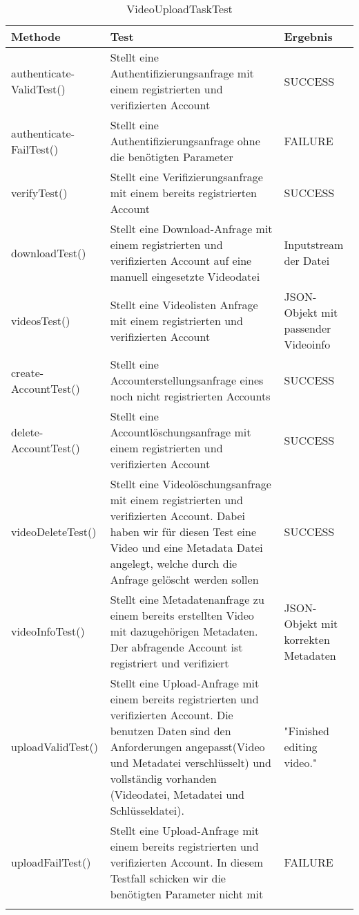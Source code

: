 \begin{longtable}{p{} | p{} | p{}}
\hline
  \textbf{Methode} & \textbf{Test} & \textbf{Ergebnis}\\
  \hline
   authenticate- \newline ValidTest() & Stellt eine Authentifizierungsanfrage mit einem registrierten und verifizierten Account & SUCCESS\\
  \hline
  authenticate- \newline FailTest() & Stellt eine Authentifizierungsanfrage ohne die benötigten Parameter & FAILURE \\
  \hline
  verifyTest() & Stellt eine Verifizierungsanfrage mit einem bereits registrierten Account & SUCCESS \\
  \hline
   downloadTest() & Stellt eine Download-Anfrage mit einem registrierten und verifizierten Account auf eine manuell eingesetzte Videodatei & Inputstream der Datei \\
  \hline
  videosTest() & Stellt eine Videolisten Anfrage mit einem registrierten und verifizierten Account & JSON-Objekt mit passender Videoinfo \\
  \hline
  create- \newline AccountTest() & Stellt eine Accounterstellungsanfrage eines noch nicht registrierten Accounts & SUCCESS \\
  \hline
  delete- \newline AccountTest() & Stellt eine Accountlöschungsanfrage mit einem registrierten und verifizierten Account & SUCCESS \\
  \hline
  videoDeleteTest() & Stellt eine Videolöschungsanfrage mit einem registrierten und verifizierten Account. Dabei haben wir für diesen Test eine Video und eine Metadata Datei angelegt, welche durch die Anfrage gelöscht werden sollen & SUCCESS \\
  \hline
  videoInfoTest() & Stellt eine Metadatenanfrage zu einem bereits erstellten Video mit dazugehörigen Metadaten. Der abfragende Account ist registriert und verifiziert & JSON-Objekt mit korrekten Metadaten \\
  \hline
  uploadValidTest() & Stellt eine Upload-Anfrage mit einem bereits registrierten und verifizierten Account. Die benutzen Daten sind den Anforderungen angepasst(Video und Metadatei verschlüsselt) und vollständig vorhanden (Videodatei, Metadatei und Schlüsseldatei). & "Finished editing video." \\
  \hline
  uploadFailTest() & Stellt eine Upload-Anfrage mit einem bereits registrierten und verifizierten Account. In diesem Testfall schicken wir die benötigten Parameter nicht mit & FAILURE \\
  \hline
  \caption{VideoUploadTaskTest}
 \end{longtable}